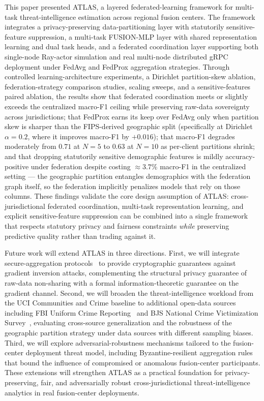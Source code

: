 \documentclass[conference]{IEEEtran}
\begin{document}
This paper presented ATLAS, a layered federated-learning framework for multi-task threat-intelligence estimation across regional fusion centers. The framework integrates a privacy-preserving data-partitioning layer with statutorily sensitive-feature suppression, a multi-task FUSION-MLP layer with shared representation learning and dual task heads, and a federated coordination layer supporting both single-node Ray-actor simulation and real multi-node distributed gRPC deployment under FedAvg and FedProx aggregation strategies. Through controlled learning-architecture experiments, a Dirichlet partition-skew ablation, federation-strategy comparison studies, scaling sweeps, and a sensitive-features paired ablation, the results show that federated coordination meets or slightly exceeds the centralized macro-F1 ceiling while preserving raw-data sovereignty across jurisdictions; that FedProx earns its keep over FedAvg only when partition skew is sharper than the FIPS-derived geographic split (specifically at Dirichlet $\alpha = 0.2$, where it improves macro-F1 by $+0.016$); that macro-F1 degrades moderately from $0.71$ at $N=5$ to $0.63$ at $N=10$ as per-client partitions shrink; and that dropping statutorily sensitive demographic features is mildly accuracy-positive under federation despite costing $\approx 3.7$\% macro-F1 in the centralized setting --- the geographic partition entangles demographics with the federation graph itself, so the federation implicitly penalizes models that rely on those columns. These findings validate the core design assumption of ATLAS: cross-jurisdictional federated coordination, multi-task representation learning, and explicit sensitive-feature suppression can be combined into a single framework that respects statutory privacy and fairness constraints \textit{while} preserving predictive quality rather than trading against it.

Future work will extend ATLAS in three directions. First, we will integrate secure-aggregation protocols~\cite{bonawitz2017secure} to provide cryptographic guarantees against gradient inversion attacks, complementing the structural privacy guarantee of raw-data non-sharing with a formal information-theoretic guarantee on the gradient channel. Second, we will broaden the threat-intelligence workload from the UCI Communities and Crime baseline to additional open-data sources including FBI Uniform Crime Reporting~\cite{fbi2024ucr} and BJS National Crime Victimization Survey~\cite{bjs2023ncvs}, evaluating cross-source generalization and the robustness of the geographic partition strategy under data sources with different sampling biases. Third, we will explore adversarial-robustness mechanisms tailored to the fusion-center deployment threat model, including Byzantine-resilient aggregation rules~\cite{blanchard2017krum, yin2018byzantine} that bound the influence of compromised or anomalous fusion-center participants. These extensions will strengthen ATLAS as a practical foundation for privacy-preserving, fair, and adversarially robust cross-jurisdictional threat-intelligence analytics in real fusion-center deployments.
\end{document}

